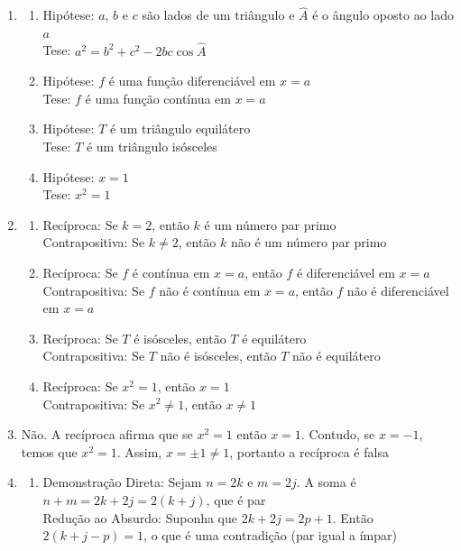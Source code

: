 \begin{enumerate}
    \item
    \begin{enumerate}
        \item Hipótese: $a$, $b$ e $c$ são lados de um triângulo e $\hat{A}$ é o ângulo oposto ao lado $a$ \\ Tese: $a^2 = b^2 + c^2 - 2bc \cos \hat{A}$
        \item Hipótese: $f$ é uma função diferenciável em $x=a$ \\ Tese: $f$ é uma função contínua em $x=a$
        \item Hipótese: $T$ é um triângulo equilátero \\ Tese: $T$ é um triângulo isósceles
        \item Hipótese: $x=1$ \\ Tese: $x^2=1$
    \end{enumerate}

    \item
    \begin{enumerate}
        \item Recíproca: Se $k=2$, então $k$ é um número par primo \\ Contrapositiva: Se $k \neq 2$, então $k$ não é um número par primo
        \item Recíproca: Se $f$ é contínua em $x=a$, então $f$ é diferenciável em $x=a$ \\ Contrapositiva: Se $f$ não é contínua em $x=a$, então $f$ não é diferenciável em $x=a$
        \item Recíproca: Se $T$ é isósceles, então $T$ é equilátero \\ Contrapositiva: Se $T$ não é isósceles, então $T$ não é equilátero
        \item Recíproca: Se $x^2=1$, então $x=1$ \\ Contrapositiva: Se $x^2 \neq 1$, então $x \neq 1$
    \end{enumerate}

    \item
    Não. A recíproca afirma que se $x^2=1$ então $x=1$. Contudo, se $x = -1$, temos que $x^2 = 1$. Assim,  $x=\pm 1 \neq 1$, portanto a recíproca é falsa

\item
\begin{enumerate}
    \item
        Demonstração Direta: Sejam $n = 2k$ e $m = 2j$. A soma é $n + m = 2k + 2j = 2(k + j)$, que é par \\
        Redução ao Absurdo: Suponha que $2k + 2j = 2p + 1$. Então $2(k + j - p) = 1$, o que é uma contradição (par igual a ímpar)


\end{enumerate}
\end{enumerate}

